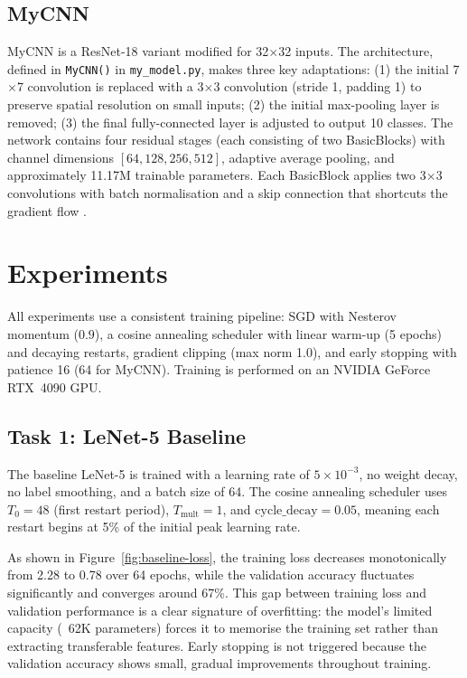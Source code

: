 \documentclass{article}
\begin{document}
\subsection{MyCNN}\label{subsec:mycnn}

MyCNN is a ResNet-18 variant modified for 32$\times$32 inputs. 
The architecture, defined in \texttt{MyCNN()} in \texttt{my\_model.py}, 
makes three key adaptations: 
(1) the initial 7$\times$7 convolution is replaced with a 3$\times$3 convolution (stride 1, padding 1) 
to preserve spatial resolution on small inputs; 
(2) the initial max-pooling layer is removed; 
(3) the final fully-connected layer is adjusted to output 10 classes. 
The network contains four residual stages (each consisting of two BasicBlocks) 
with channel dimensions $[64, 128, 256, 512]$, adaptive average pooling, 
and approximately 11.17M trainable parameters. 
Each BasicBlock applies two 3$\times$3 convolutions with batch normalisation 
and a skip connection that shortcuts the gradient flow \citep{he2016deep}.


\section{Experiments}\label{sec:experiments}

All experiments use a consistent training pipeline: 
SGD with Nesterov momentum ($0.9$), a cosine annealing scheduler with linear warm-up (5 epochs) 
and decaying restarts, gradient clipping (max norm 1.0), and early stopping with patience 16 (64 for MyCNN).
Training is performed on an NVIDIA GeForce RTX~4090 GPU.

\subsection{Task 1: LeNet-5 Baseline}\label{subsec:task-1}

The baseline LeNet-5 is trained with a learning rate of $5\times10^{-3}$, 
no weight decay, no label smoothing, and a batch size of 64. 
The cosine annealing scheduler uses $T_0 = 48$ (first restart period), $T_{\text{mult}} = 1$, 
and $\text{cycle\_decay} = 0.05$, meaning each restart begins at 5\% of the initial peak learning rate.

As shown in Figure~\ref{fig:baseline-loss}, 
the training loss decreases monotonically from 2.28 to 0.78 over 64 epochs, 
while the validation accuracy fluctuates significantly and converges around 67\%. 
This gap between training loss and validation performance is a clear signature of overfitting: 
the model's limited capacity (~62K parameters) forces it to memorise the training set 
rather than extracting transferable features. 
Early stopping is not triggered because the validation accuracy shows small, 
gradual improvements throughout training.
\end{document}
